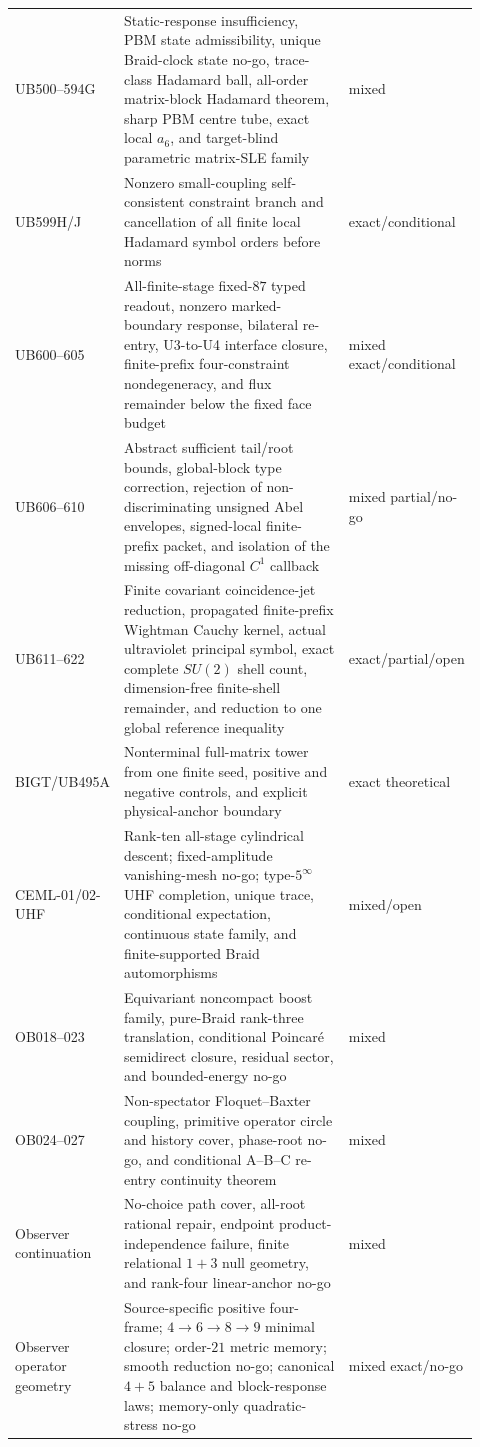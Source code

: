 \documentclass[11pt]{article}
\theoremstyle{definition}
\theoremstyle{remark}
\begin{document}
\begin{longtable}{@{}p{0.16\linewidth}p{0.58\linewidth}p{0.18\linewidth}@{}}
UB500--594G & Static-response insufficiency, PBM state admissibility, unique Braid-clock state no-go, trace-class Hadamard ball, all-order matrix-block Hadamard theorem, sharp PBM centre tube, exact local $a_6$, and target-blind parametric matrix-SLE family & mixed\\
UB599H/J & Nonzero small-coupling self-consistent constraint branch and cancellation of all finite local Hadamard symbol orders before norms & exact/conditional\\
UB600--605 & All-finite-stage fixed-$87$ typed readout, nonzero marked-boundary response, bilateral re-entry, U3-to-U4 interface closure, finite-prefix four-constraint nondegeneracy, and flux remainder below the fixed face budget & mixed exact/conditional\\
UB606--610 & Abstract sufficient tail/root bounds, global-block type correction, rejection of non-discriminating unsigned Abel envelopes, signed-local finite-prefix packet, and isolation of the missing off-diagonal $C^1$ callback & mixed partial/no-go\\
UB611--622 & Finite covariant coincidence-jet reduction, propagated finite-prefix Wightman Cauchy kernel, actual ultraviolet principal symbol, exact complete $SU(2)$ shell count, dimension-free finite-shell remainder, and reduction to one global reference inequality & exact/partial/open\\
BIGT/UB495A & Nonterminal full-matrix tower from one finite seed, positive and negative controls, and explicit physical-anchor boundary & exact theoretical\\
CEML-01/02-UHF & Rank-ten all-stage cylindrical descent; fixed-amplitude vanishing-mesh no-go; type-$5^\infty$ UHF completion, unique trace, conditional expectation, continuous state family, and finite-supported Braid automorphisms & mixed/open\\
OB018--023 & Equivariant noncompact boost family, pure-Braid rank-three translation, conditional Poincar\'e semidirect closure, residual sector, and bounded-energy no-go & mixed\\
OB024--027 & Non-spectator Floquet--Baxter coupling, primitive operator circle and history cover, phase-root no-go, and conditional A--B--C re-entry continuity theorem & mixed\\
Observer continuation & No-choice path cover, all-root rational repair, endpoint product-independence failure, finite relational $1+3$ null geometry, and rank-four linear-anchor no-go & mixed\\
Observer operator geometry & Source-specific positive four-frame; $4\to6\to8\to9$ minimal closure; order-$21$ metric memory; smooth reduction no-go; canonical $4+5$ balance and block-response laws; memory-only quadratic-stress no-go & mixed exact/no-go\\

\end{longtable}
\end{document}
